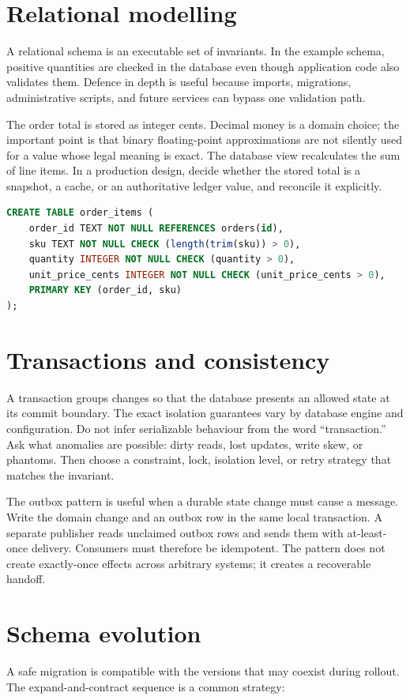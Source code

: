 \section{Relational modelling}
A relational schema is an executable set of invariants. In the example schema,
positive quantities are checked in the database even though application code
also validates them. Defence in depth is useful because imports, migrations,
administrative scripts, and future services can bypass one validation path.

The order total is stored as integer cents. Decimal money is a domain choice;
the important point is that binary floating-point approximations are not silently
used for a value whose legal meaning is exact. The database view recalculates the
sum of line items. In a production design, decide whether the stored total is a
snapshot, a cache, or an authoritative ledger value, and reconcile it explicitly.

\begin{lstlisting}[language=SQL,caption={A constraint is part of the data contract.}]
CREATE TABLE order_items (
    order_id TEXT NOT NULL REFERENCES orders(id),
    sku TEXT NOT NULL CHECK (length(trim(sku)) > 0),
    quantity INTEGER NOT NULL CHECK (quantity > 0),
    unit_price_cents INTEGER NOT NULL CHECK (unit_price_cents > 0),
    PRIMARY KEY (order_id, sku)
);
\end{lstlisting}

\section{Transactions and consistency}
A transaction groups changes so that the database presents an allowed state at
its commit boundary. The exact isolation guarantees vary by database engine and
configuration. Do not infer serializable behaviour from the word “transaction.”
Ask what anomalies are possible: dirty reads, lost updates, write skew, or
phantoms. Then choose a constraint, lock, isolation level, or retry strategy that
matches the invariant.

The outbox pattern is useful when a durable state change must cause a message.
Write the domain change and an outbox row in the same local transaction. A
separate publisher reads unclaimed outbox rows and sends them with at-least-once
delivery. Consumers must therefore be idempotent. The pattern does not create
exactly-once effects across arbitrary systems; it creates a recoverable handoff.

\section{Schema evolution}
A safe migration is compatible with the versions that may coexist during rollout.
The expand-and-contract sequence is a common strategy:

